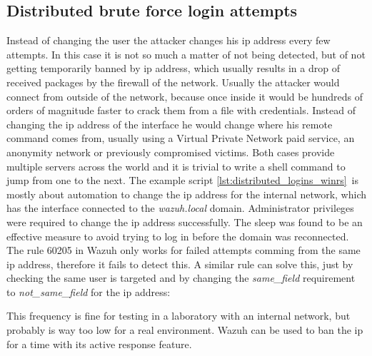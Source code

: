 \subsection{Distributed brute force login attempts}
Instead of changing the user the attacker changes his ip address every few attempts. In this case it is not so much a matter of not being detected, but of not getting temporarily banned by ip address, which usually results in a drop of received packages by the firewall of the network.
\linej
\linej
Usually the attacker would connect from outside of the network, because once inside it would be hundreds of orders of magnitude faster to crack them from a file with credentials.
Instead of changing the ip address of the interface he would change where his remote command comes from, usually using a Virtual Private Network paid service, an anonymity network or previously compromised victims.
Both cases provide multiple servers across the world and it is trivial to write a shell command to jump from one to the next.
\linej
The example script \ref{lst:distributed_logins_winrs}\ is mostly about automation to change the ip address for the internal network, which has the interface connected to the \textit{wazuh.local} domain.
Administrator privileges were required to change the ip address successfully. The sleep was found to be an effective measure to avoid trying to log in before the domain was reconnected.
\linej
\linej
The rule 60205 in Wazuh only works for failed attempts comming from the same ip address, therefore it fails to detect this. A similar rule can solve this, just by checking the same user is targeted and by changing the \textit{same\_field} requirement to \textit{not\_same\_field} for the ip address:

\linej
This frequency is fine for testing in a laboratory with an internal network, but probably is way too low for a real environment.
Wazuh can be used to ban the ip for a time with its active response feature\cite{active_response}.

